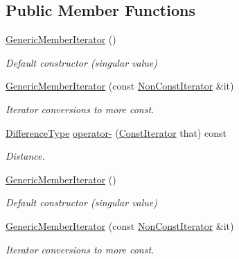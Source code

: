 \subsection*{Public Member Functions}
\begin{DoxyCompactItemize}
\item 
\hyperlink{classGenericMemberIterator_ad0db649cdfd28d943e16e6c848613cfc}{Generic\+Member\+Iterator} ()
\begin{DoxyCompactList}\small\item\em Default constructor (singular value) \end{DoxyCompactList}\item 
\hyperlink{classGenericMemberIterator_a2697fd327a90654b0bf91c988e43f95e}{Generic\+Member\+Iterator} (const \hyperlink{classGenericMemberIterator_abc26eb06f2962765b11dcd06ce84ac02}{Non\+Const\+Iterator} \&it)
\begin{DoxyCompactList}\small\item\em Iterator conversions to more const. \end{DoxyCompactList}\item 
\mbox{\label{classGenericMemberIterator_ae119ae8ed78dbd980f83d367f59a3c94}} 
\hyperlink{classGenericMemberIterator_a902b99c8ae351cd7626514dc5f30740a}{Difference\+Type} \hyperlink{classGenericMemberIterator_ae119ae8ed78dbd980f83d367f59a3c94}{operator-\/} (\hyperlink{classGenericMemberIterator_ae5be27a73dce0be58ee2776db896d591}{Const\+Iterator} that) const
\begin{DoxyCompactList}\small\item\em Distance. \end{DoxyCompactList}\item 
\hyperlink{classGenericMemberIterator_a2708717d497a0aadacdf75900de4c5b4}{Generic\+Member\+Iterator} ()
\begin{DoxyCompactList}\small\item\em Default constructor (singular value) \end{DoxyCompactList}\item 
\hyperlink{classGenericMemberIterator_a2697fd327a90654b0bf91c988e43f95e}{Generic\+Member\+Iterator} (const \hyperlink{classGenericMemberIterator_abc26eb06f2962765b11dcd06ce84ac02}{Non\+Const\+Iterator} \&it)
\begin{DoxyCompactList}\small\item\em Iterator conversions to more const. \end{DoxyCompactList}\item 

\end{DoxyCompactItemize}
